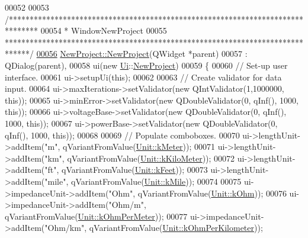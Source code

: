 \begin{DoxyCode}
00052 
00053 \textcolor{comment}{/*******************************************************************************}
00054 \textcolor{comment}{ * WindowNewProject}
00055 \textcolor{comment}{ ******************************************************************************/}
\hypertarget{newproject_8cpp_source_l00056}{}\hyperlink{group___window_ga011ff7a4c380f74bdafa4fdaed510c42}{00056} \hyperlink{group___window_ga011ff7a4c380f74bdafa4fdaed510c42}{NewProject::NewProject}(QWidget *parent)
00057   : QDialog(parent),
00058     ui(new \hyperlink{namespace_ui}{Ui}::\hyperlink{class_new_project}{NewProject})
00059 \{
00060   \textcolor{comment}{// Set-up user interface.}
00061   ui->setupUi(\textcolor{keyword}{this});
00062 
00063   \textcolor{comment}{// Create validator for data input.}
00064   ui->maxIterations->setValidator(\textcolor{keyword}{new} QIntValidator(1,1000000, \textcolor{keyword}{this}));
00065   ui->minError->setValidator(\textcolor{keyword}{new} QDoubleValidator(0, qInf(), 1000, \textcolor{keyword}{this}));
00066   ui->voltageBase->setValidator(\textcolor{keyword}{new} QDoubleValidator(0, qInf(), 1000, \textcolor{keyword}{this}));
00067   ui->powerBase->setValidator(\textcolor{keyword}{new} QDoubleValidator(0, qInf(), 1000, \textcolor{keyword}{this}));
00068 
00069   \textcolor{comment}{// Populate comboboxes.}
00070   ui->lengthUnit->addItem(\textcolor{stringliteral}{"m"}, qVariantFromValue(\hyperlink{class_unit_a8c8921f7b225ad6063b1cb573425b9a0abfa41ebe7ee649a1f02c9b8ae570434b}{Unit::kMeter}));
00071   ui->lengthUnit->addItem(\textcolor{stringliteral}{"km"}, qVariantFromValue(\hyperlink{class_unit_a8c8921f7b225ad6063b1cb573425b9a0a1c04f3dd196dbe1832a2658215b0d919}{Unit::kKiloMeter}));
00072   ui->lengthUnit->addItem(\textcolor{stringliteral}{"ft"}, qVariantFromValue(\hyperlink{class_unit_a8c8921f7b225ad6063b1cb573425b9a0a9ac9b167b0ebce477fb53d6ace04ddc8}{Unit::kFeet}));
00073   ui->lengthUnit->addItem(\textcolor{stringliteral}{"mile"}, qVariantFromValue(\hyperlink{class_unit_a8c8921f7b225ad6063b1cb573425b9a0a2ebde742068bbee0510de32fbb4cd724}{Unit::kMile}));
00074 
00075   ui->impedanceUnit->addItem(\textcolor{stringliteral}{"Ohm"}, qVariantFromValue(\hyperlink{class_unit_a3747e779c805df24a71961290be3fbdfa6b9c74d1763eefbaf751eeecff0bd9da}{Unit::kOhm}));
00076   ui->impedanceUnit->addItem(\textcolor{stringliteral}{"Ohm/m"}, qVariantFromValue(\hyperlink{class_unit_a3747e779c805df24a71961290be3fbdfa35e9ca44deb5a35fdb576111cf0db336}{Unit::kOhmPerMeter}));
00077   ui->impedanceUnit->addItem(\textcolor{stringliteral}{"Ohm/km"}, qVariantFromValue(\hyperlink{class_unit_a3747e779c805df24a71961290be3fbdfa56a0289d2ddeff7ca4aa8ba410df79d6}{Unit::kOhmPerKilometer}));

\end{DoxyCode}
